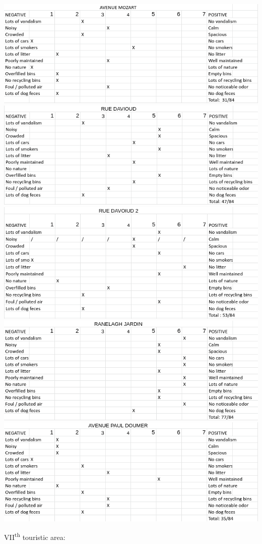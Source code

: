 \documentclass[11pt,letterpaper]{article}
\begin{document}
\includegraphics[width=0.5\linewidth]{media/bipolar/mozart.png}
\includegraphics[width=0.5\linewidth]{media/bipolar/davioud1.png}
\includegraphics[width=0.5\linewidth]{media/bipolar/davioud2.png}
\includegraphics[width=0.5\linewidth]{media/bipolar/ranelagh.png}
\includegraphics[width=0.5\linewidth]{media/bipolar/pauldoumer.png}

VII\textsuperscript{th} touristic area:
\end{document}
